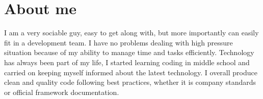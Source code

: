 \section*{About me}
I am a very sociable guy, easy to get along with, but more importantly can easily fit in a development team.
I have no problems dealing with high pressure situation because of my ability to manage time and tasks efficiently.
Technology has always been part of my life, I started learning coding in middle school and carried on keeping myself informed about the latest technology.
I overall produce clean and quality code following best practices, whether it is company standards or official framework documentation.
